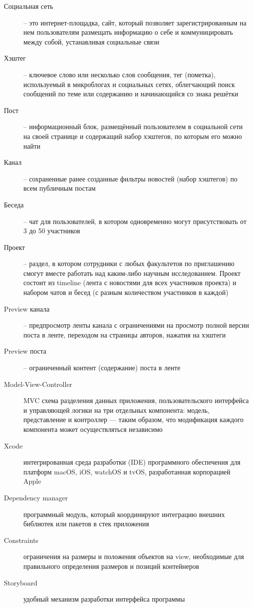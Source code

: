 \begin{description}
		\item[Социальная сеть] -- это интернет-площадка, сайт, который позволяет зарегистрированным на нем пользователям размещать информацию о себе и коммуницировать между собой, устанавливая социальные связи
		\item[Хэштег] -- ключевое слово или несколько слов сообщения, тег (пометка), используемый в микроблогах и социальных сетях, облегчающий поиск сообщений по теме или содержанию и начинающийся со знака решётки \label{term: hash}
		\item[Пост] -- информационный блок, размещённый пользователем в социальной сети на своей странице и содержащий набор хэштегов, по которым его можно найти \label{term: post}
		\item[Канал] -- сохраненные ранее созданные фильтры новостей (набор хэштегов) по всем публичным постам \label{term: channel}
		\item [Беседа] -- чат для пользователей, в котором одновременно могут присутствовать от 3 до 50 участников \label{term: chat}
		\item [Проект]  -- раздел, в котором сотрудники с любых факультетов по приглашению смогут вместе работать над каким-либо научным исследованием. Проект состоит из timeline (лента с новостями для всех участников проекта) и набором чатов и бесед (с разным количеством участников в каждой) \label{term: project}
		\item [Preview канала]  -- предпросмотр ленты канала с ограничениями на просмотр полной версии поста в ленте, переходом на страницы авторов, нажатия на хэштеги \label{term: preview}
		\item [Preview поста]  -- ограниченный контент (содержание) поста в ленте \label{term: previewPost}
		\item [Model-View-Controller] MVC схема разделения данных приложения, пользовательского интерфейса и управляющей логики на три отдельных компонента: модель, представление и контроллер — таким образом, что модификация каждого компонента может осуществляться независимо
		\item [Xcode] интегрированная среда разработки (IDE) программного обеспечения для платформ macOS, iOS, watchOS и tvOS, разработанная корпорацией Apple
		\item [Dependency manager] программный модуль, который координируют интеграцию внешних библиотек или пакетов в стек приложения
		\item [Constraints] ограничения на размеры и положения объектов на view,  необходимые для правильного определения размеров и позиций контейнеров
		\item [Storyboard] удобный механизм разработки интерфейса программы
	\end{description}